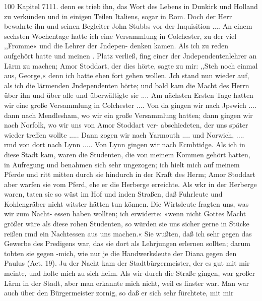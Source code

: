 100 Kapitel 7111.
denn es trieb ihn, das Wort des Lebens in Dunkirk und Holland
zu verkünden und in einigen Teilen Italiens, sogar in Rom.
Doch der Herr bewahrte ihn und seinen Begleiter John Stubbs
vor der Inquisition ....
An einem sechsten Wochentage hatte ich eine Versammlung
in Colchester, zu der viel ,,Fromme« und die Lehrer der Jndepen-
denken kamen. Als ich zu reden aufgehört hatte und meinen
. Platz verließ, fing einer der Jndependentenlehrer an Lärm zu
machen; Amor Stoddart, der dies hörte, sagte zu mir: ,,Steh
noch einmal aus, George,« denn ich hatte eben fort gehen wollen.
Jch stand nun wieder auf, als ich die lärmenden Jndependenten
hörte; und bald kam die Macht des Herrn über ihn und über
alle und überwältigte sie ....
Am nächsten Ersten Tage hatten wir eine große Versammlung
in Colchester .... Von da gingen wir nach Jpswich .... dann
nach Mendlesham, wo wir ein große Versammlung hatten; dann
gingen wir nach Norfolk, wo wir uns von Amor Stoddart ver-
abschiedeten, der uns später wieder treffen wollte ..... Dann
zogen wir nach Yarmouth .... und Norwich, .... rmd von
dort nach Lynn ..... Von Lynn gingen wir nach Ecmbtidge.
Als ich in diese Stadt kam, waren die Studenten, die von
meinem Kommen gehört hatten, in Aufregung und benahmen
sich sehr ungezogen; ich hielt mich auf meinem Pferde und ritt
mitten durch sie hindurch in der Kraft des Herm; Amor Stoddart
aber warfen sie vom Pferd, ehe er die Herberge erreichte. Als
wkr in der Herberge waren, taten sie so wüst im Hof und inden
Straßen, daß Fuhrleute und Kohlengräber nicht witster hätten
tun können. Die Wirtsleute fragten uns, was wir zum Nacht-
essen haben wollten; ich erwiderte: »wenn nicht Gottes Macht
größer wäre als diese rohen Studenten, so würden sie uns sicher
gerne in Stücke reißen rmd ein Nachtessen aus uns machen.« Sie
wußten, daß ich sehr gegen das Gewerbe des Predigens war, das
sie dort als Lehrjungen erlernen sollten; darum tobten sie gegen
-mich, wie nur je die Handwerksleute der Diana gegen den Paulus
(Act. 19). Ju der Nacht kam der Stadtbürgermeister, der es gut
mit mir meinte, und holte mich zu sich heim. Als wir durch
die Straße gingen, war großer Lärm in der Stadt, aber man
erkannte mich nicht, weil es finster war. Man war auch über
den Bürgermeister zornig, so daß er sich sehr fürchtete, mit mir


